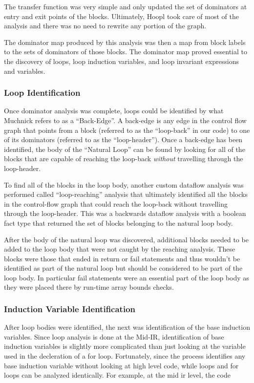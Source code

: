 \documentclass[11pt]{article}
\begin{document}
The transfer function was very simple and only updated the set of
dominators at entry and exit points of the blocks. Ultimately, Hoopl
took care of most of the analysis and there was no need to rewrite any
portion of the graph. 

The dominator map produced by this analysis was then a map from
block labels to the sets of dominators of those blocks. The dominator
map proved essential to the discovery of loops, loop induction
variables, and loop invariant expressions and variables. 

\subsubsection {Loop Identification}

Once dominator analysis was complete, loops could be identified by
what Muchnick refers to as a ``Back-Edge''. A back-edge is any edge in
the control flow graph that points from a block (referred to as the
``loop-back'' in our code) to one of its dominators (referred to as
the ``loop-header''). Once a back-edge has been identified, the body
of the ``Natural Loop'' can be found by looking for all of the blocks
that are capable of reaching the loop-back \emph{without} travelling
through the loop-header.  

To find all of the blocks in the loop body, another custom dataflow
analysis was performed called ``loop-reaching'' analysis that
ultimately identified all the blocks in the control-flow graph that
could reach the loop-back without travelling through the
loop-header. This was a backwards dataflow analysis with a boolean
fact type that returned the set of blocks belonging to the natural
loop body. 

After the body of the natural loop was discovered, additional blocks
needed to be added to the loop body that were not caught by the
reaching analysis. These blocks were those that ended in return or
fail statements and thus wouldn't be identified as part of the natural
loop but should be considered to be part of the loop body. In
particular fail statements were an essential part of the loop body as
they were placed there by run-time array bounds checks. 

\subsubsection {Induction Variable Identification} 

After loop bodies were identified, the next was identification of the
base induction variables. Since loop analysis is done at the Mid-IR,
identification of base induction variables is slightly more
complicated than just looking at the variable used in the decleration
of a for loop. Fortunately, since the process identifies any base
induction variable without looking at high level code, while loops and
for loops can be analyzed identically. For example, at the mid ir
level, the code 
\end{document}
